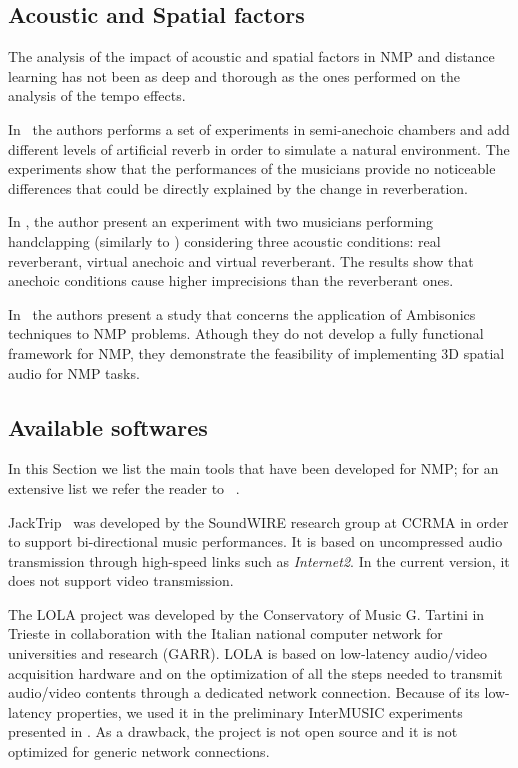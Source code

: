 \subsection{Acoustic and Spatial factors}\label{subsec:acoustics}
The analysis of the impact of acoustic and spatial factors in NMP and distance learning has not been as deep and thorough as the ones performed on the analysis of the tempo effects. 

In~\cite{carot2009towards} the authors performs a set of experiments in semi-anechoic chambers and add different levels of artificial reverb in order to simulate a natural environment. The experiments show that the performances of the musicians provide no noticeable differences that could be directly explained by the change in reverberation. 

In \cite{FarnerReverb}, the author present an experiment with two musicians performing handclapping (similarly to \cite{Chafe1}) considering three acoustic conditions: real reverberant, virtual anechoic and virtual reverberant. The results show that anechoic conditions cause higher imprecisions than the reverberant ones.

In~\cite{gurevich2011ambisonic} the authors present a study that concerns the application of Ambisonics techniques to NMP problems. Athough they do not develop a fully functional framework for NMP, they demonstrate the feasibility of implementing 3D spatial audio for NMP tasks. %


\subsection{Available softwares}\label{subsec:sw}
In this Section we list the main tools that have been developed for NMP; for an extensive list we refer the reader to ~\cite{RottondiOverview}.

JackTrip~\cite{CaceresJacktrip} was developed by the SoundWIRE research group at CCRMA in order to support bi-directional music performances. It is based on uncompressed audio transmission through high-speed links such as \textit{Internet2}. In the current version, it does not support video transmission.

The LOLA\cite{drioli2013networked} project was developed by the Conservatory of Music G. Tartini in Trieste in collaboration with the Italian national computer network for universities and research (GARR). LOLA is based on low-latency audio/video acquisition hardware and on the optimization of all the steps needed to transmit audio/video contents through a dedicated network connection. Because of  its low-latency properties, we used it in the preliminary InterMUSIC experiments presented in \cite{CIM2018}. As a drawback, the project is not open source and it is not optimized for generic network connections.

